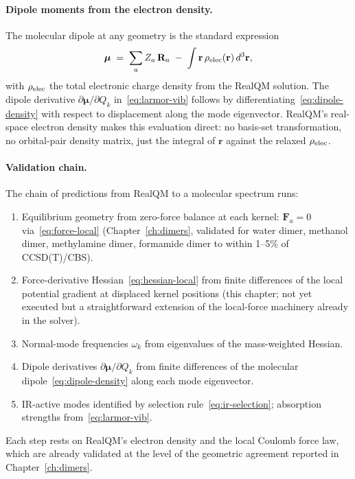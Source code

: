 \paragraph{Dipole moments from the electron density.}
The molecular dipole at any geometry is the standard expression
\begin{equation}\label{eq:dipole-density}
\boldsymbol{\mu} \;=\; \sum_a Z_a\, \mathbf{R}_a \;-\; \int \mathbf{r}\, \rho_{\rm elec}(\mathbf{r})\, d^3\mathbf{r},
\end{equation}
with $\rho_{\rm elec}$ the total electronic charge density from the RealQM solution. The dipole derivative $\partial\boldsymbol{\mu}/\partial Q_k$ in~\eqref{eq:larmor-vib} follows by differentiating~\eqref{eq:dipole-density} with respect to displacement along the mode eigenvector. RealQM's real-space electron density makes this evaluation direct: no basis-set transformation, no orbital-pair density matrix, just the integral of $\mathbf{r}$ against the relaxed $\rho_{\rm elec}$.

\paragraph{Validation chain.}
The chain of predictions from RealQM to a molecular spectrum runs:
\begin{enumerate}
\item Equilibrium geometry from zero-force balance at each kernel: $\mathbf{F}_a = 0$ via~\eqref{eq:force-local} (Chapter~\ref{ch:dimers}, validated for water dimer, methanol dimer, methylamine dimer, formamide dimer to within 1--5\% of CCSD(T)/CBS).
\item Force-derivative Hessian~\eqref{eq:hessian-local} from finite differences of the local potential gradient at displaced kernel positions (this chapter; not yet executed but a straightforward extension of the local-force machinery already in the solver).
\item Normal-mode frequencies $\omega_k$ from eigenvalues of the mass-weighted Hessian.
\item Dipole derivatives $\partial\boldsymbol{\mu}/\partial Q_k$ from finite differences of the molecular dipole~\eqref{eq:dipole-density} along each mode eigenvector.
\item IR-active modes identified by selection rule~\eqref{eq:ir-selection}; absorption strengths from~\eqref{eq:larmor-vib}.
\end{enumerate}
Each step rests on RealQM's electron density and the local Coulomb force law, which are already validated at the level of the geometric agreement reported in Chapter~\ref{ch:dimers}.

